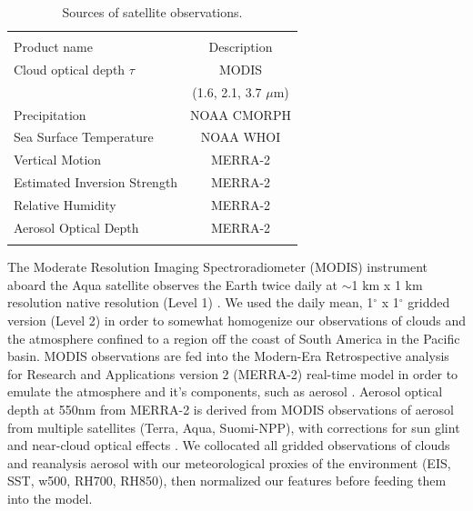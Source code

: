 \begin{table}
    \caption{Sources of satellite observations.}
    \label{tab:obstable}
    \centering
    \begin{tabular}{lc}
        \multicolumn{1}{c}{}                   \\
        Product name     & Description \\
        \midrule
        Cloud optical depth \(\tau\) & MODIS   \\
        & (1.6, 2.1, 3.7 \(\mu\)m) \\
        Precipitation & NOAA CMORPH \\
        Sea Surface Temperature & NOAA WHOI \\
        Vertical Motion & MERRA-2 \\
        Estimated Inversion Strength &  MERRA-2  \\
        Relative Humidity & MERRA-2 \\
        Aerosol Optical Depth & MERRA-2  \\
        \bottomrule
        \label{tab:datasources}
    \end{tabular}
    \vspace{-2em}
\end{table}
The Moderate Resolution Imaging Spectroradiometer (MODIS) instrument aboard the Aqua satellite observes the Earth twice daily at \(\sim\)1 km x 1 km resolution native resolution (Level 1) \citep{baum2006introduction}. We used the daily mean, 1\(^{\circ}\) x 1\(^{\circ}\) gridded version (Level 2) in order to somewhat homogenize our observations of clouds and the atmosphere confined to a region off the coast of South America in the Pacific basin. MODIS observations are fed into the Modern-Era Retrospective analysis for Research and Applications version 2 (MERRA-2) real-time model in order to emulate the atmosphere and it's components, such as aerosol \citep{gelaro2017modern}. Aerosol optical depth at 550nm from MERRA-2 is derived from MODIS observations of aerosol from multiple satellites (Terra, Aqua, Suomi-NPP), with corrections for sun glint and near-cloud optical effects \citep{bosilovich2015merra}. We collocated all gridded observations of clouds and reanalysis aerosol with our meteorological proxies of the environment (EIS, SST, w500, RH700, RH850), then normalized our features before feeding them into the model.